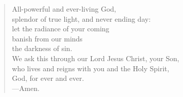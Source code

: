 \prayer

\setlength{\leftmargini}{\prayerleftmargini}

\begin{verse}
All-powerful and ever-living God,\\
splendor of true light, and never ending day:\\
let the radiance of your coming\\
banish from our minds\\
the darkness of sin.\\
We ask this through our Lord Jesus Christ, your Son,\\
who lives and reigns with you and the Holy Spirit,\\
God, for ever and ever.\\
{\color{red}---\thinspace}Amen.
\end{verse}

\setlength{\leftmargini}{\defleftmargini}